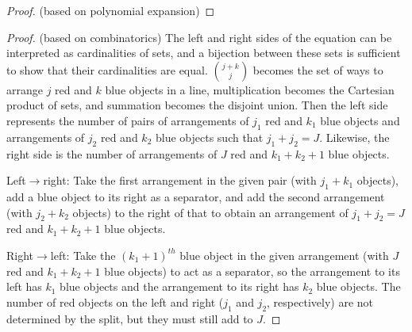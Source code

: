 \documentclass{article}
\begin{document}
\begin{proof}
  (based on polynomial expansion)
\end{proof}

\begin{proof}
  (based on combinatorics)
  The left and right sides of the equation can be interpreted as cardinalities of sets,
  and a bijection between these sets is sufficient to show that their cardinalities are equal.
  $\binom{j+k}{j}$ becomes the set of ways to arrange $j$ red and $k$ blue objects in a line,
  multiplication becomes the Cartesian product of sets, and summation becomes the disjoint union.
  Then the left side represents the number of pairs of
  arrangements of $j_1$ red and $k_1$ blue objects and
  arrangements of $j_2$ red and $k_2$ blue objects
  such that $j_1+j_2=J$.
  Likewise, the right side is the number of arrangements of $J$ red and $k_1+k_2+1$ blue objects.

  Left$\rightarrow$right: Take the first arrangement in the given pair (with $j_1+k_1$ objects),
  add a blue object to its right as a separator,
  and add the second arrangement (with $j_2+k_2$ objects) to the right of that
  to obtain an arrangement of $j_1+j_2=J$ red and $k_1+k_2+1$ blue objects.

  Right$\rightarrow$left: Take the $(k_1+1)^{th}$ blue object in the given arrangement
  (with $J$ red and $k_1+k_2+1$ blue objects) to act as a separator,
  so the arrangement to its left has $k_1$ blue objects
  and the arrangement to its right has $k_2$ blue objects.
  The number of red objects on the left and right ($j_1$ and $j_2$, respectively)
  are not determined by the split, but they must still add to $J$.
  
\end{proof}
\end{document}
